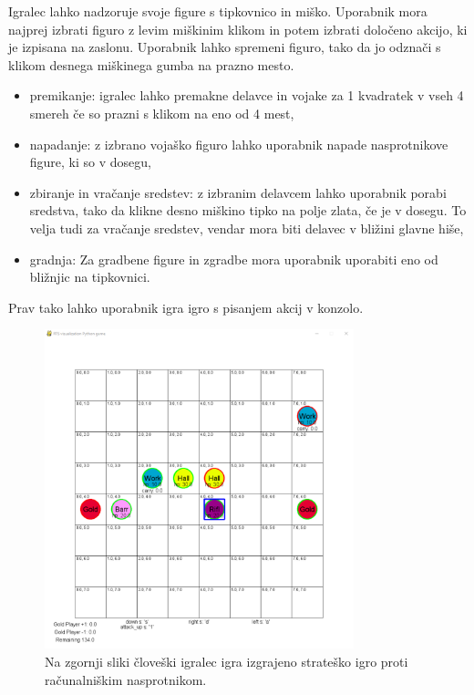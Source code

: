 \documentclass[a4paper, 12pt]{book}
\begin{document}
Igralec lahko nadzoruje svoje figure s tipkovnico in miško.
Uporabnik mora najprej izbrati figuro z levim miškinim klikom in potem izbrati določeno akcijo, ki je izpisana na zaslonu. 
Uporabnik lahko spremeni figuro, tako da jo odznači s klikom desnega miškinega gumba na prazno mesto.

\begin{itemize}
	\item premikanje: igralec lahko premakne delavce in vojake za 1 kvadratek v vseh 4 smereh če so prazni s klikom na eno od 4 mest,
	\item napadanje: z izbrano vojaško figuro lahko uporabnik napade nasprotnikove figure, ki so v dosegu,
	\item zbiranje in vračanje sredstev: z izbranim delavcem lahko uporabnik porabi sredstva, tako da klikne desno miškino tipko na polje zlata, če je v dosegu. 
	To velja tudi za vračanje sredstev, vendar mora biti delavec v bližini glavne hiše,
	\item gradnja: Za gradbene figure in zgradbe mora uporabnik uporabiti eno od bližnjic na tipkovnici.
\end{itemize}

Prav tako lahko uporabnik igra igro s pisanjem akcij v konzolo.

\begin{figure}[h]
	\begin{center}
		\includegraphics[width=0.8\textwidth]{photos/visualization_pygame.pdf}
	\end{center}
	\caption{Na zgornji sliki človeški igralec igra izgrajeno strateško igro proti računalniškim nasprotnikom.}
	\label{visualization_pygame}
\end{figure}
\end{document}
